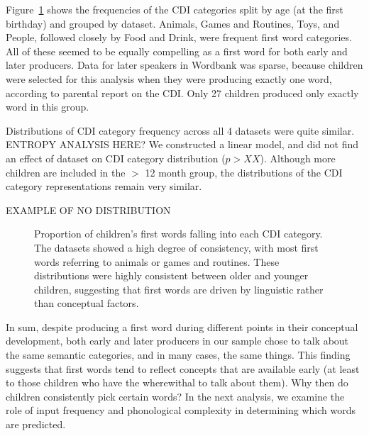 \documentclass[10pt,letterpaper]{article}
\begin{document}
Figure~\ref{fig:cdi_cats} shows the frequencies of the CDI categories split by age (at the first birthday) and grouped by dataset. Animals, Games and Routines, Toys, and People, followed closely by Food and Drink, were frequent first word categories. All of these seemed to be equally compelling as a first word for both early and later producers. Data for later speakers in Wordbank was sparse, because children were selected for this analysis when they were producing exactly one word, according to parental report on the CDI. Only 27 children produced only exactly word in this group.

Distributions of CDI category frequency across all 4 datasets were quite similar. ENTROPY ANALYSIS HERE? We constructed a linear model, and did not find an effect of dataset on CDI category distribution ($p > XX$). Although more children are included in the $>$ 12 month group, the distributions of the CDI category representations remain very similar.


EXAMPLE OF NO DISTRIBUTION 

\begin{figure}[tb]
\caption{\label{fig:cdi_cats} Proportion of children's first words falling into each CDI category. The datasets showed a high degree of consistency, with most first words referring to animals or games and routines. These distributions were highly consistent between older and younger children, suggesting that first words are driven by linguistic rather than conceptual factors.}
\end{figure}


In sum, despite producing a first word during different points in their conceptual development, both early and later producers in our sample chose to talk about the same semantic categories, and in many cases, the same things. This finding suggests that first words tend to reflect concepts that are available early (at least to those children who have the wherewithal to talk about them). Why then do children consistently pick certain words? In the next analysis, we examine the role of input frequency and phonological complexity in determining which words are predicted. 
\end{document}
